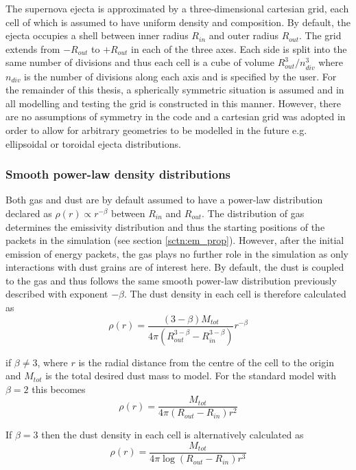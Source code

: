 The supernova ejecta is approximated by a three-dimensional cartesian grid, each cell of which is assumed to have uniform density and composition.  By default, the ejecta occupies a shell between inner radius $R_{in}$ and outer radius $R_{out}$. The grid extends from $-R_{out}$ to $+R_{out}$ in each of the three axes.  Each side is split into the same number of divisions and thus each cell is a cube of volume $R_{out}^3/n_{div}^3$ where $n_{div}$ is the number of divisions along each axis and is specified by the user.  For the remainder of this thesis, a spherically symmetric situation is assumed and in all modelling and testing the grid is constructed in this manner.  However, there are no assumptions of symmetry in the code and a cartesian grid was adopted in order to allow for arbitrary geometries to be modelled in the future e.g. ellipsoidal or toroidal ejecta distributions.

\subsubsection{Smooth power-law density distributions}

Both gas and dust are by default assumed to have a power-law distribution declared as  $\rho(r) \propto r^{-\beta}$ between $R_{in}$ and $R_{out}$.  The distribution of gas determines the emissivity distribution and thus the starting positions of the packets in the simulation (see section \ref{sctn:em_prop}).  However, after the initial emission of energy packets, the gas plays no further role in the simulation as only interactions with dust grains are of interest here.  By default, the dust is coupled to the gas and thus follows the same smooth power-law distribution previously described with exponent $-\beta$.  The dust density in each cell is therefore calculated as
\begin{equation}
\rho (r)= \frac{(3-\beta)M_{tot}}{4\pi (R_{out}^{3-\beta}-R_{in}^{3-\beta})} r^{-\beta}
\end{equation}


\noindent if $\beta \neq 3$, where $r$ is the radial distance from the centre of the cell to the origin and $M_{tot}$ is the total desired dust mass to model.  For the standard model with $\beta=2$ this becomes
\begin{equation}
\rho (r)= \frac{M_{tot}}{4\pi (R_{out}-R_{in})r^2}
\end{equation}

\noindent If $\beta = 3$ then the dust density in each cell is alternatively calculated as 
\begin{equation}
\rho (r)= \frac{M_{tot}}{4\pi \log (R_{out}-R_{in})r^{3}} 
\end{equation}


